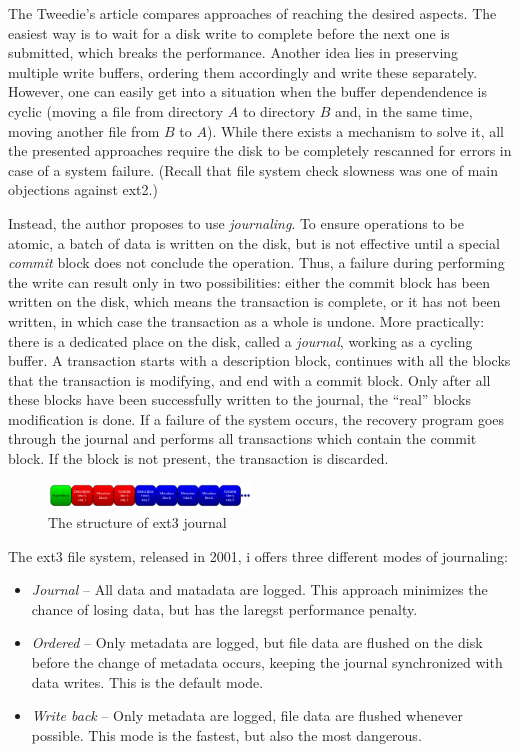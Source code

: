 \documentclass{acm_proc_article-sp}
\begin{document}
The Tweedie's article \cite{extjournal} compares approaches of reaching the desired aspects. The easiest way is to wait for a disk write to complete before the next one is submitted, which breaks the performance. Another idea lies in preserving multiple write buffers, ordering them accordingly and write these separately. However, one can easily get into a situation when the buffer dependendence is cyclic (moving a file from directory $A$ to directory $B$ and, in the same time, moving another file from $B$ to $A$). While there exists a mechanism to solve it, all the presented approaches require the disk to be completely rescanned for errors in case of a system failure. (Recall that file system check slowness was one of main objections against ext2.)

Instead, the author proposes to use {\it journaling}. To ensure operations to be atomic, a batch of data is written on the disk, but is not effective until a special {\it commit} block does not conclude the operation. Thus, a failure during performing the write can result only in two possibilities: either the commit block has been written on the disk, which means the transaction is complete, or it has not been written, in which case the transaction as a whole is undone. More practically: there is a dedicated place on the disk, called a {\it journal}, working as a cycling buffer. A transaction starts with a description block, continues with all the blocks that the transaction is modifying, and end with a commit block. Only after all these blocks have been successfully written to the journal, the ``real'' blocks modification is done. If a failure of the system occurs, the recovery program goes through the journal and performs all transactions which contain the commit block. If the block is not present, the transaction is discarded.

\begin{figure}
\centering
\includegraphics[width=0.48\textwidth]{images/journal.pdf}
	\caption{The structure of ext3 journal \cite{takingadvantage}}
\end{figure}

The ext3 file system, released in 2001, i offers three different modes of journaling: \cite{takingadvantage}

\begin{itemize}
	\item {\it Journal} -- All data and matadata are logged. This approach minimizes the chance of losing data, but has the laregst performance penalty.
	\item {\it Ordered} -- Only metadata are logged, but file data are flushed on the disk before the change of metadata occurs, keeping the journal synchronized with data writes. This is the default mode.
	\item {\it Write back} -- Only metadata are logged, file data are flushed whenever possible. This mode is the fastest, but also the most dangerous.
\end{itemize}
\end{document}
